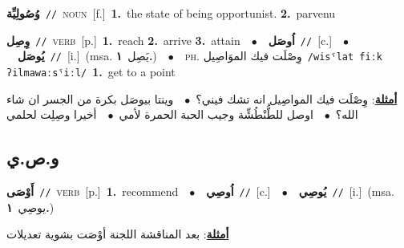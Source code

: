 \documentclass[10pt,a4paper,twoside]{article} %
\begin{document}
\begin{multicols}{2}
{\setlength\topsep{0pt}\textbf{\foreignlanguage{arabic}{وُصُولِيِّة}}\ {\color{gray}\texttt{//}\color{black}}\ \textsc{noun}\ [f.]\ \textbf{1.}~the state of being opportunist.  \textbf{2.}~parvenu\ } \vspace{2mm}

{\setlength\topsep{0pt}\textbf{\foreignlanguage{arabic}{وِصِل}}\ {\color{gray}\texttt{//}\color{black}}\ \textsc{verb}\ [p.]\ \textbf{1.}~reach  \textbf{2.}~arrive  \textbf{3.}~attain\ \ $\bullet$\ \ \setlength\topsep{0pt}\textbf{\foreignlanguage{arabic}{اُوصَل}}\ {\color{gray}\texttt{//}\color{black}}\ [c.]\ \ $\bullet$\ \ \setlength\topsep{0pt}\textbf{\foreignlanguage{arabic}{يُوصَل}}\ {\color{gray}\texttt{//}\color{black}}\ [i.]\ \color{gray}(msa. \foreignlanguage{arabic}{يَصِل}~\foreignlanguage{arabic}{\textbf{١.}})\color{black}\ \ $\bullet$\ \ \textsc{ph.} \color{gray} \foreignlanguage{arabic}{وِصْلَت فيك الموَاصِيل}\color{black}\ {\color{gray}\texttt{/{\sffamily wisˤlat fiːk ʔilmawaːsˤiːl}/}\color{black}}\ \textbf{1.}~get to a point\  \begin{flushright}\color{gray}\foreignlanguage{arabic}{\textbf{\underline{\foreignlanguage{arabic}{أمثلة}}}: وِصْلَت فيك المواصِيل انه تشك فيني؟\ $\bullet$\ \  وينتا بيوصَل بكرة من الجسر ان شاء الله؟\ $\bullet$\ \  اوصل للطُّنْطُشِّة وجيب الحبة الحمرة لأمي\ $\bullet$\ \  أخيرا وصِلِت لحلمي}\end{flushright}\color{black}} \vspace{2mm}

\vspace{-3mm}
\subsection*{\color{blue}\foreignlanguage{arabic}{و.ص.ي}\color{blue}{}} 

{\setlength\topsep{0pt}\textbf{\foreignlanguage{arabic}{أَوْصَى}}\ {\color{gray}\texttt{//}\color{black}}\ \textsc{verb}\ [p.]\ \textbf{1.}~recommend\ \ $\bullet$\ \ \setlength\topsep{0pt}\textbf{\foreignlanguage{arabic}{اُوصِي}}\ {\color{gray}\texttt{//}\color{black}}\ [c.]\ \ $\bullet$\ \ \setlength\topsep{0pt}\textbf{\foreignlanguage{arabic}{يُوصِي}}\ {\color{gray}\texttt{//}\color{black}}\ [i.]\ \color{gray}(msa. \foreignlanguage{arabic}{يوصِي}~\foreignlanguage{arabic}{\textbf{١.}})\color{black}\  \begin{flushright}\color{gray}\foreignlanguage{arabic}{\textbf{\underline{\foreignlanguage{arabic}{أمثلة}}}: بعد المناقشة اللجنة أوْصَت بشوية تعديلات}\end{flushright}\color{black}} \vspace{2mm}


\end{multicols}
\end{document}
